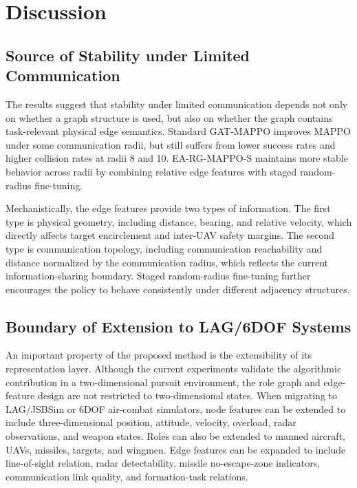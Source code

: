 \section{Discussion}

\subsection{Source of Stability under Limited Communication}

The results suggest that stability under limited communication depends not only on whether a graph structure is used, but also on whether the graph contains task-relevant physical edge semantics. Standard GAT-MAPPO improves MAPPO under some communication radii, but still suffers from lower success rates and higher collision rates at radii 8 and 10. EA-RG-MAPPO-S maintains more stable behavior across radii by combining relative edge features with staged random-radius fine-tuning.

Mechanistically, the edge features provide two types of information. The first type is physical geometry, including distance, bearing, and relative velocity, which directly affects target encirclement and inter-UAV safety margins. The second type is communication topology, including communication reachability and distance normalized by the communication radius, which reflects the current information-sharing boundary. Staged random-radius fine-tuning further encourages the policy to behave consistently under different adjacency structures.

\subsection{Boundary of Extension to LAG/6DOF Systems}

An important property of the proposed method is the extensibility of its representation layer. Although the current experiments validate the algorithmic contribution in a two-dimensional pursuit environment, the role graph and edge-feature design are not restricted to two-dimensional states. When migrating to LAG/JSBSim or 6DOF air-combat simulators, node features can be extended to include three-dimensional position, attitude, velocity, overload, radar observations, and weapon states. Roles can also be extended to manned aircraft, UAVs, missiles, targets, and wingmen. Edge features can be expanded to include line-of-sight relation, radar detectability, missile no-escape-zone indicators, communication link quality, and formation-task relations.

